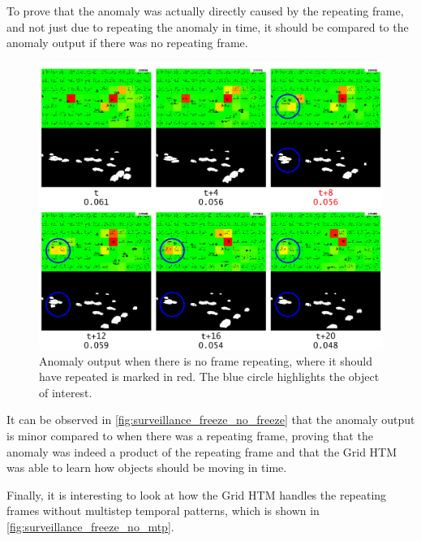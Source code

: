 \par
To prove that the anomaly was actually directly caused by the repeating frame, and not just due to repeating the anomaly in time, it should be compared to the anomaly output if there was no repeating frame.
\begin{figure}[H]
    \centering
    \includegraphics[width=\textwidth]{resources/experiments/surveillance/surveillance_freeze_no_freeze.png}
    \caption[No Frame Repeat Anomaly]{Anomaly output when there is no frame repeating, where it should have repeated is marked in red. The blue circle highlights the object of interest.}
    \label{fig:surveillance_freeze_no_freeze}
\end{figure}
It can be observed in \autoref{fig:surveillance_freeze_no_freeze} that the anomaly output is minor compared to when there was a repeating frame, proving that the anomaly was indeed a product of the repeating frame and that the Grid HTM was able to learn how objects should be moving in time.
\par
Finally, it is interesting to look at how the Grid HTM handles the repeating frames without multistep temporal patterns, which is shown in \autoref{fig:surveillance_freeze_no_mtp}.
